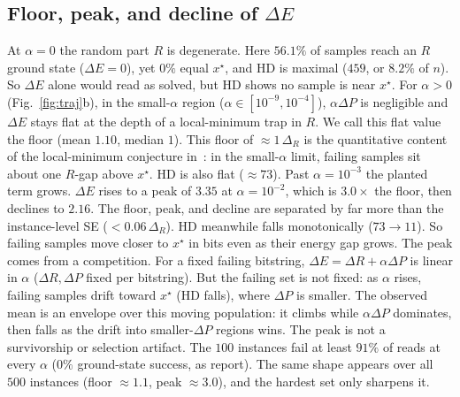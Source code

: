 \documentclass[10pt, conference]{IEEEtran}
\begin{document}
\subsection{Floor, peak, and decline of $\Delta E$}
\label{sec:vpc}
At $\alpha{=}0$ the random part $R$ is degenerate. Here $56.1\%$ of samples
reach an $R$ ground state ($\Delta E{=}0$), yet $0\%$ equal $x^\star$, and HD is
maximal ($459$, or $8.2\%$ of $n$). So $\Delta E$ alone would read as solved,
but HD shows no sample is near $x^\star$. For $\alpha{>}0$ (Fig.~\ref{fig:traj}b),
in the small-$\alpha$ region ($\alpha\in[10^{-9},10^{-4}]$), $\alpha\Delta P$ is
negligible and $\Delta E$ stays flat at the depth of a local-minimum trap in $R$. We call this
flat value the floor (mean $1.10$, median $1$). This floor of $\approx1\,\Delta_R$
is the quantitative content of the local-minimum conjecture
in~\cite{pelofske2024hardened}: in the small-$\alpha$ limit, failing samples sit
about one $R$-gap above $x^\star$. HD is also flat ($\approx73$). Past $\alpha{=}10^{-3}$ the planted term grows. $\Delta
E$ rises to a peak of $3.35$ at $\alpha{=}10^{-2}$, which is $3.0\times$ the
floor, then declines to $2.16$. The floor, peak, and decline are separated by
far more than the instance-level SE ($<0.06\,\Delta_R$). HD meanwhile falls
monotonically ($73\to11$). So failing samples move closer to $x^\star$ in bits
even as their energy gap grows. The peak comes from a
competition. For a fixed failing bitstring,
$\Delta E{=}\Delta R{+}\alpha\Delta P$ is linear in $\alpha$ ($\Delta R,\Delta P$
fixed per bitstring). But the failing set is not fixed: as $\alpha$ rises,
failing samples drift toward $x^\star$ (HD falls), where $\Delta P$ is smaller.
The observed mean is an envelope over this moving population: it climbs while
$\alpha\Delta P$ dominates, then falls as the drift into smaller-$\Delta P$
regions wins. The peak is
not a survivorship or selection artifact. The $100$ instances fail at least
$91\%$ of reads at every $\alpha$ ($0\%$ ground-state success, as
\cite{pelofske2024hardened} report). The same shape appears over all $500$
instances (floor $\approx1.1$, peak $\approx3.0$), and the hardest set only
sharpens it.
\end{document}
